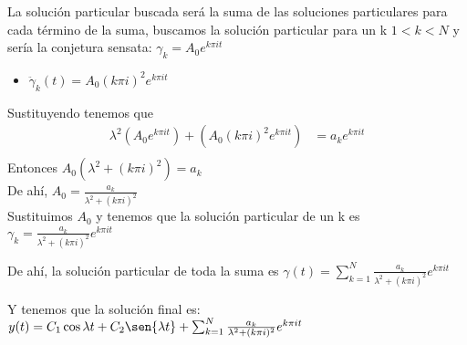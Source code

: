 \documentclass{article}
\begin{document}
\begin{enumerate}
{            La solución particular buscada será la suma de las soluciones particulares para cada término de la suma, buscamos la solución particular para un k $1<k<N$ y sería la conjetura sensata: $\gamma_k = A_0 e^{k \pi i t}$
            
            \begin{itemize}
            	\item $\ddot \gamma_k(t)= A_0 (k \pi i)^2e^{k \pi i t} $
            \end{itemize}
        
         Sustituyendo tenemos que
        \begin{align*}
        \lambda^2 (A_0 e^{k \pi i t}) + (A_0 (k \pi i)^2e^{k \pi i t}) &= a_ke^{k \pi i t} \\[0.2cm]
        \end{align*}
        Entonces $A_0 (\lambda^2 + (k \pi i)^2) = a_k$ \\[0.2cm]
        De ahí, $A_0 = \frac{a_k}{\lambda^2 + (k \pi i)^2}$\\
        Sustituimos $A_0$ y tenemos que la solución particular de un k es  $\gamma_k = \frac{a_k}{\lambda^2 + (k \pi i)^2} e^{k \pi i t}$
        
        De ahí, la solución particular de toda la suma es $\gamma (t) = \sum_{k=1}^{N} \frac{a_k}{\lambda^2 + (k \pi i)^2} e^{k \pi i t} $
        
        Y tenemos que la solución final es: $y(t) = C_1\cos{\lambda t}+C_2\sen{\lambda t} + \sum_{k=1}^{N} \frac{a_k}{\lambda^2 + (k \pi i)^2} e^{k \pi i t}$ 
         
        }
    \end{enumerate}
\end{document}
